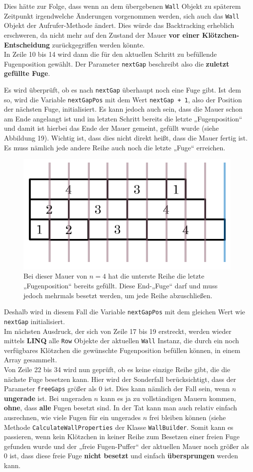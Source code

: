 \documentclass[a4paper,12pt]{article}
\newcommand{\code}{\texttt}
\begin{document}
Dies hätte zur Folge, dass wenn an dem übergebenen \code{Wall} Objekt zu späterem Zeitpunkt irgendwelche Änderungen vorgenommen werden, sich auch das \code{Wall} Objekt der Aufrufer-Methode ändert. Dies würde das Backtracking erheblich erschweren, da nicht mehr auf den Zustand der Mauer \textbf{vor einer Klötzchen-Entscheidung} zurückgegriffen werden könnte.
\\[0.4cm]
In Zeile 10 bis 14 wird dann die für den aktuellen Schritt zu befüllende Fugenposition gewählt. Der Parameter \code{nextGap} beschreibt also die \textbf{zuletzt gefüllte Fuge}.

Es wird überprüft, ob es nach \code{nextGap} überhaupt noch eine Fuge gibt. Ist dem so, wird die Variable \code{nextGapPos} mit dem Wert \code{nextGap + 1}, also der Position der nächsten Fuge, initialisiert. Es kann jedoch auch sein, dass die Mauer schon am Ende angelangt ist und im letzten Schritt bereits die letzte „Fugenposition“ und damit ist hierbei das Ende der Mauer gemeint, gefüllt wurde (siehe Abbildung 19). Wichtig ist, dass dies nicht direkt heißt, dass die Mauer fertig ist. Es muss nämlich jede andere Reihe auch noch die letzte „Fuge“ erreichen.
\begin{figure}[H]
    \centering
    \includegraphics[width=.6\linewidth]{Bilder/Aufgabe1/Code_Algorithmus_01.png}
    \caption{Bei dieser Mauer von $n = 4$ hat die unterste Reihe die letzte „Fugenposition“ bereits gefüllt. Diese End-„Fuge“ darf und muss jedoch mehrmals besetzt werden, um jede Reihe abzuschließen.}
\end{figure}
Deshalb wird in diesem Fall die Variable \code{nextGapPos} mit dem gleichen Wert wie \code{nextGap} initialisiert.
\\[0.4cm]
Im nächsten Ausdruck, der sich von Zeile 17 bis 19 erstreckt, werden wieder mittels \textbf{LINQ} \citep{csharp6} alle \code{Row} Objekte der aktuellen \code{Wall} Instanz, die durch ein noch verfügbares Klötzchen die gewünschte Fugenposition befüllen können, in einem Array gesammelt.
\\[0.4cm]
Von Zeile 22 bis 34 wird nun geprüft, ob es keine einzige Reihe gibt, die die nächste Fuge besetzen kann. Hier wird der Sonderfall berücksichtigt, dass der Parameter \code{freeGaps} größer als 0 ist. Dies kann nämlich der Fall sein, wenn $n$ \textbf{ungerade} ist. Bei ungeraden $n$ kann es ja zu vollständigen Mauern kommen, \textbf{ohne}, dass \textbf{alle} Fugen besetzt sind. In der Tat kann man auch relativ einfach ausrechnen, wie viele Fugen für ein ungerades $n$ frei bleiben können (siehe Methode \code{CalculateWallProperties} der Klasse \code{WallBuilder}. Somit kann es passieren, wenn kein Klötzchen in keiner Reihe zum Besetzen einer freien Fuge gefunden wurde und der „freie Fugen-Puffer“ der aktuellen Mauer noch größer als 0 ist, dass diese freie Fuge \textbf{nicht besetzt} und einfach \textbf{übersprungen} werden kann.
\end{document}
